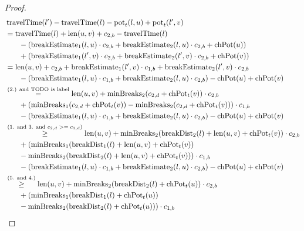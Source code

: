 \begin{proof}
	\begin{align}
		\begin{split}\label{eq:label_n_feasibility_proof_3}
			&\concretett(l') - \concretett(l) - \concretepotential_t(l,u) + \concretepotential_t(l',v)\\
			&= \concretett(l) + \len(u,v) + \restr_{2,b} - \concretett(l)\\
			& \phantom{{}=1} - (\breakEstimate_1(l,u) \cdot \restr_{2,b} + \breakEstimate_2(l,u) \cdot \restr_{2,b} + \chpotential(u))\\
			& \phantom{{}=1} + (\breakEstimate_1(l',v) \cdot \restr_{2,b} + \breakEstimate_2(l',v) \cdot \restr_{2,b} + \chpotential(v))\\
			&= \len(u,v) + \restr_{2,b} + \breakEstimate_1(l',v) \cdot \restr_{1,b} + \breakEstimate_2(l',v) \cdot \restr_{2,b} \\
			& \phantom{{}=1} - (\breakEstimate_1(l,u) \cdot \restr_{1,b} + \breakEstimate_2(l,u) \cdot \restr_{2,b}) - \chpotential(u) + \chpotential(v)\\
			&\stackrel{\text{(2.) and TODO is label}}{=} \len(u,v) + \minBreaks_2(\restr_{2,d} + \chpotential_t(v)) \cdot \restr_{2,b}\\
			& \phantom{{}=1} + (\minBreaks_1(\restr_{2,d} + \chpotential_t(v)) - \minBreaks_{2}(\restr_{2,d} + \chpotential_t(v))) \cdot \restr_{1,b} \\
			& \phantom{{}=1} - (\breakEstimate_1(l,u) \cdot \restr_{1,b} + \breakEstimate_2(l,u) \cdot \restr_{2,b}) - \chpotential(u) + \chpotential(v)\\
			&\stackrel{\text{(1. and 3. and $\restr_{2,d} >= \restr_{1,d}$)}}{\ge} \len(u,v) + \minBreaks_2(\breakDist_2(l) + \len(u,v) + \chpotential_t(v)) \cdot \restr_{2,b}\\
			& \phantom{{}=1} + (\minBreaks_1(\breakDist_1(l) + \len(u,v) + \chpotential_t(v))\\
			& \phantom{{}=1} - \minBreaks_{2}(\breakDist_2(l) + \len(u,v) +\chpotential_t(v))) \cdot \restr_{1,b} \\
			& \phantom{{}=1} - (\breakEstimate_1(l,u) \cdot \restr_{1,b} + \breakEstimate_2(l,u) \cdot \restr_{2,b}) - \chpotential(u) + \chpotential(v)\\
			&\stackrel{\text{(5. and 4.)}}{\ge} \len(u,v) + \minBreaks_2(\breakDist_2(l) + \chpotential_t(u)) \cdot \restr_{2,b}\\
			& \phantom{{}=1} + (\minBreaks_1(\breakDist_1(l) + \chpotential_t(u))\\
			& \phantom{{}=1} - \minBreaks_{2}(\breakDist_{2}(l) + \chpotential_t(u))) \cdot \restr_{1,b} \\

\end{split}
\end{align}
\end{proof}
